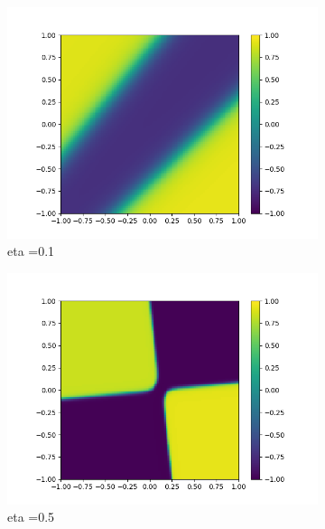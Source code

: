 \begin{figure}[ht!]
  \centering
  \begin{subfigure}[b]{.3\linewidth}
    \includegraphics[width=\linewidth]{fig/xor2221_eta01.png}
    \caption{eta =0.1}
  \end{subfigure}
  \quad
  \begin{subfigure}[b]{.3\linewidth}
    \includegraphics[width=\linewidth]{fig/xor2221_eta05.png}
    \caption{eta =0.5}
  \end{subfigure}
  \quad
  \begin{subfigure}[b]{.3\linewidth}

\end{subfigure}
\end{figure}
